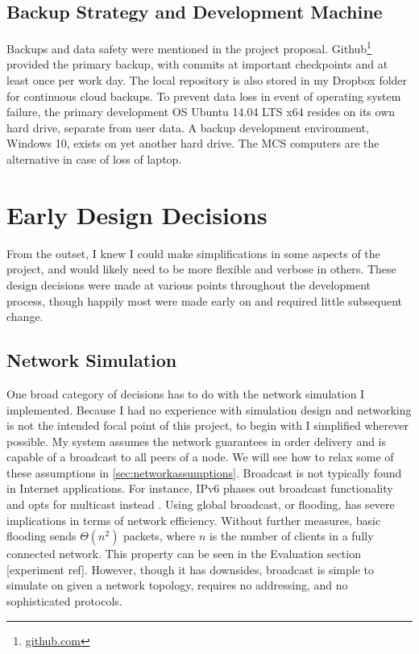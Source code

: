 \documentclass[12pt,a4paper,twoside,openright]{report}
\begin{document}
	\subsection{Backup Strategy and Development Machine}
	Backups and data safety were mentioned in the project proposal. Github\footnote{\url{github.com}} provided the primary backup, with commits at important checkpoints and at least once per work day. The local repository is also stored in my Dropbox folder for continuous cloud backups. To prevent data loss in event of operating system failure, the primary development OS Ubuntu 14.04 LTS x64 resides on its own hard drive, separate from user data. A backup development environment, Windows 10, exists on yet another hard drive. The MCS computers are the alternative in case of loss of laptop.
	
	
\section{Early Design Decisions}
From the outset, I knew I could make simplifications in some aspects of the project, and would likely need to be more flexible and verbose in others. These design decisions were made at various points throughout the development process, though happily most were made early on and required little subsequent change. 

	\subsection{Network Simulation}
	One broad category of decisions has to do with the network simulation I implemented. Because I had no experience with simulation design and networking is not the intended focal point of this project, to begin with I simplified wherever possible. My system assumes the network guarantees in order delivery and is capable of a broadcast to all peers of a node. We will see how to relax some of these assumptions in \cref{sec:networkassumptions}. Broadcast is not typically found in Internet applications. For instance, IPv6 phases out broadcast functionality and opts for multicast instead \cite{RFC2460}. Using global broadcast, or flooding, has severe implications in terms of network efficiency. Without further measures, basic flooding sends $\Theta (n^{2})$ packets, where $n$ is the number of clients in a fully connected network. This property can be seen in the Evaluation  section [experiment ref]. However, though it has downsides, broadcast is simple to simulate on given a network topology, requires no addressing, and no sophisticated protocols.
	
\end{document}

